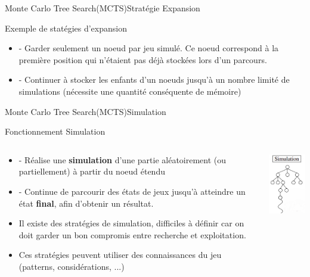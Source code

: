 \begin{frame}{Monte Carlo Tree Search(MCTS)}{Stratégie Expansion}
	\begin{block}{Exemple de statégies d'expansion}
			\begin{itemize}
				\item - Garder seulement un noeud par jeu simulé. Ce noeud correspond à la première position qui n'étaient pas déjà stockées lors d'un parcours.
				\item - Continuer à stocker les enfants d'un noeuds jusqu'à un nombre limité de simulations (nécessite une quantité conséquente de mémoire)
			\end{itemize}
	\end{block}
\end{frame}

\begin{frame}{Monte Carlo Tree Search(MCTS)}{Simulation}
	\begin{block}{Fonctionnement Simulation}
		\begin{columns}
			\begin{column}{7cm}
				\begin{itemize}
					\item - Réalise une \textbf{simulation} d'une partie aléatoirement (ou partiellement) à partir du noeud étendu
					\item - Continue de parcourir des états de jeux jusqu'à atteindre un état \textbf{final}, afin d'obtenir un résultat.
					\item Il existe des stratégies de simulation, difficiles à définir car on doit garder un bon compromis entre recherche et exploitation.
					\item Ces stratégies peuvent utiliser des connaissances du jeu (patterns, considérations, ...)
				\end{itemize}
			\end{column}
			\begin{column}{4cm}
				\includegraphics[width=3cm]{ressources/MCTS/Simulation.png}
			\end{column}
		\end{columns}
	\end{block}
\end{frame}

